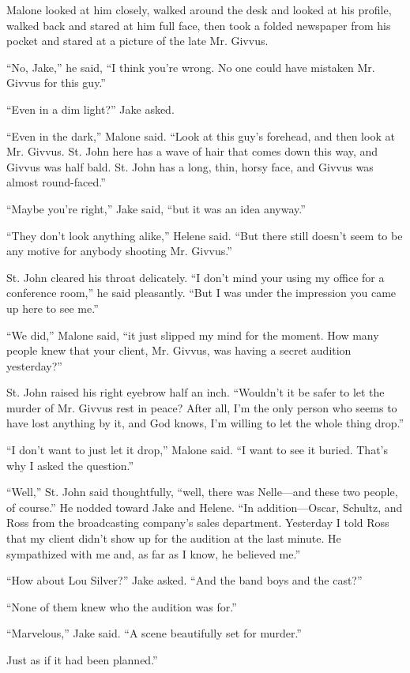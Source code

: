 \documentclass{novel}
\begin{document}
Malone looked at him closely, walked around the desk and looked at his profile, walked back and stared at him full face, then took a folded newspaper from his pocket and stared at a picture of the late Mr. Givvus.

“No, Jake,” he said, “I think you’re wrong. No one could have mistaken Mr. Givvus for this guy.”

“Even in a dim light?” Jake asked.

“Even in the dark,” Malone said. “Look at this guy’s forehead, and then look at Mr. Givvus. St. John here has a wave of hair that comes down this way, and Givvus was half bald. St. John has a long, thin, horsy face, and Givvus was almost round-faced.”

“Maybe you’re right,” Jake said, “but it was an idea anyway.”

“They don’t look anything alike,” Helene said. “But there still doesn’t seem to be any motive for anybody shooting Mr. Givvus.”

St. John cleared his throat delicately. “I don’t mind your using my office for a conference room,” he said pleasantly. “But I was under the impression you came up here to see me.”

“We did,” Malone said, “it just slipped my mind for the moment. How many people knew that your client, Mr. Givvus, was having a secret audition yesterday?”

St. John raised his right eyebrow half an inch. “Wouldn’t it be safer to let the murder of Mr. Givvus rest in peace? After all, I’m the only person who seems to have lost anything by it, and God knows, I’m willing to let the whole thing drop.”

“I don’t want to just let it drop,” Malone said. “I want to see it buried. That’s why I asked the question.”

“Well,” St. John said thoughtfully, “well, there was Nelle—and these two people, of course.” He nodded toward Jake and Helene. “In addition—Oscar, Schultz, and Ross from the broadcasting company’s sales department. Yesterday I told Ross that my client didn’t show up for the audition at the last minute. He sympathized with me and, as far as I know, he believed me.”

“How about Lou Silver?” Jake asked. “And the band boys and the cast?”

“None of them knew who the audition was for.”

“Marvelous,” Jake said. “A scene beautifully set for murder.”

Just as if it had been planned.”
\end{document}
